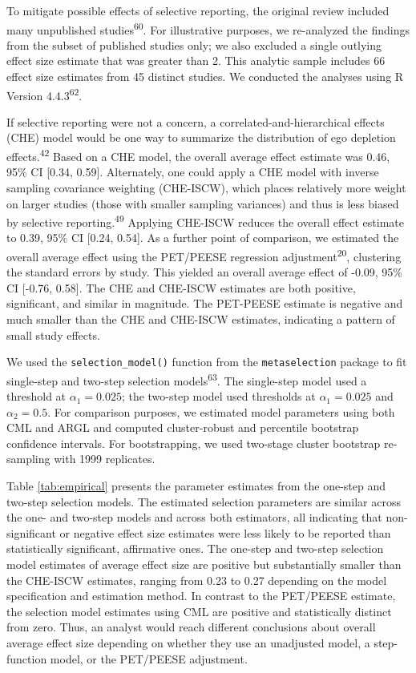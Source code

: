 \documentclass[
  man, donotrepeattitle,floatsintext]{apa7}
\begin{document}
To mitigate possible effects of selective reporting, the original review included many unpublished studies\textsuperscript{60}.
For illustrative purposes, we re-analyzed the findings from the subset of published studies only; we also excluded a single outlying effect size estimate that was greater than 2. This analytic sample includes 66 effect size estimates from 45 distinct studies.
We conducted the analyses using R Version 4.4.3\textsuperscript{62}.

If selective reporting were not a concern, a correlated-and-hierarchical effects (CHE) model would be one way to summarize the distribution of ego depletion effects.\textsuperscript{42}
Based on a CHE model, the overall average effect estimate was 0.46, 95\% CI {[}0.34, 0.59{]}.
Alternately, one could apply a CHE model with inverse sampling covariance weighting (CHE-ISCW), which places relatively more weight on larger studies (those with smaller sampling variances) and thus is less biased by selective reporting.\textsuperscript{49}
Applying CHE-ISCW reduces the overall effect estimate to 0.39, 95\% CI {[}0.24, 0.54{]}.
As a further point of comparison, we estimated the overall average effect using the PET/PEESE regression adjustment\textsuperscript{20}, clustering the standard errors by study. This yielded an overall average effect of -0.09, 95\% CI {[}-0.76, 0.58{]}. The CHE and CHE-ISCW estimates are both positive, significant, and similar in magnitude. The PET-PEESE estimate is negative and much smaller than the CHE and CHE-ISCW estimates, indicating a pattern of small study effects.

We used the \texttt{selection\_model()} function from the \texttt{metaselection} package to fit single-step and two-step selection models\textsuperscript{63}.
The single-step model used a threshold at \(\alpha_1 = 0.025\); the two-step model used thresholds at \(\alpha_1 = 0.025\) and \(\alpha_2 = 0.5\).
For comparison purposes, we estimated model parameters using both CML and ARGL and computed cluster-robust and percentile bootstrap confidence intervals.
For bootstrapping, we used two-stage cluster bootstrap re-sampling with 1999 replicates.

Table \ref{tab:empirical} presents the parameter estimates from the one-step and two-step selection models.
The estimated selection parameters are similar across the one- and two-step models and across both estimators, all indicating that non-significant or negative effect size estimates were less likely to be reported than statistically significant, affirmative ones.
The one-step and two-step selection model estimates of average effect size are positive but substantially smaller than the CHE-ISCW estimates, ranging from 0.23 to 0.27 depending on the model specification and estimation method.
In contrast to the PET/PEESE estimate, the selection model estimates using CML are positive and statistically distinct from zero.
Thus, an analyst would reach different conclusions about overall average effect size depending on whether they use an unadjusted model, a step-function model, or the PET/PEESE adjustment.
\end{document}

